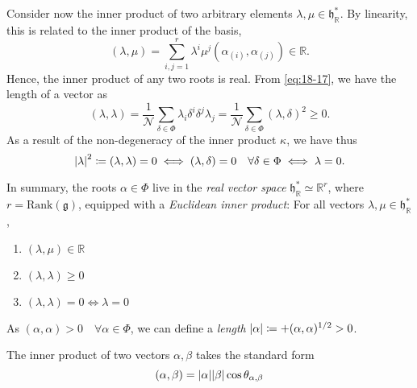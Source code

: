 Consider now the inner product of two arbitrary elements $\lambda, \mu \in \mathfrak{h}^*_{\mathbb{R}}$.
By linearity, this is related to the inner product of the basis,
\begin{equation}
  (\lambda ,\mu) = \sum_{i, j =1}^{r} \lambda^{i} \mu^{j} (\alpha_{(i)}, \alpha_{(j)}) \in \mathbb{R}.
\end{equation}
Hence, the inner product of any two roots is real.
From \eqref{eq:18-17}, we have the length of a vector as
\begin{equation}
  (\lambda, \lambda) = \frac{1}{\mathcal{N}} \sum_{\delta \in \Phi} \lambda_{i} \delta^{i} \delta^{j} \lambda_{j} = \frac{1}{\mathcal{N}} \sum_{\delta \in \Phi} (\lambda, \delta)^2 \geq 0.
\end{equation}
As a result of the non-degeneracy of the inner product $\kappa$, we have thus
\begin{equation}
  \abs{\lambda}^2 \coloneqq (\lambda, \lambda) = 0 \iff (\lambda, \delta) = 0 \quad \forall \delta \in \Phi \iff \lambda = 0.
\end{equation}

In summary, the roots $\alpha \in \Phi$ live in the \emph{real vector space} $\mathfrak{h}^*_{\mathbb{R}} \simeq \mathbb{R}^r$, where $r = \text{Rank}(\mathfrak{g})$, equipped with a \emph{Euclidean inner product}:
For all vectors $\lambda, \mu \in \mathfrak{h}^*_{\mathbb{R}}$, 
\begin{enumerate}
  \item $(\lambda, \mu) \in \mathbb{R}$ 
  \item $(\lambda, \lambda) \geq 0$ 
  \item $(\lambda,  \lambda) = 0 \iff \lambda = 0$
\end{enumerate}

\begin{wrapfigure}{R}{0.3\columnwidth}
  \centering
  \def\svgwidth{0.25\columnwidth}
  
  \caption{}
  \label{fig:l18f1}
\end{wrapfigure}

\begin{definition}[]
  As $(\alpha, \alpha) > 0 \quad \forall \alpha \in \Phi$, we can define a \emph{length} $\abs{\alpha} \coloneqq + (\alpha, \alpha)^{1 / 2} > 0$.
\end{definition}
The inner product of two vectors $\alpha, \beta$ takes the standard form
\begin{equation}
  (\alpha, \beta) = \abs{\alpha} \abs{\beta} \cos\theta_{\alpha, \beta}
\end{equation}

